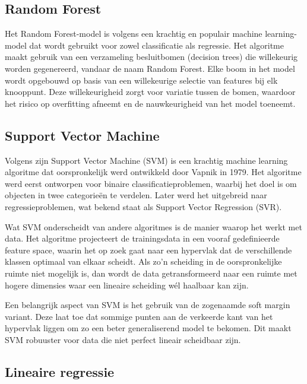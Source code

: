 \subsection*{Random Forest}

Het Random Forest-model is volgens \textcite{Sekhar2016} een krachtig en populair machine learning-model dat wordt gebruikt voor zowel classificatie als regressie. Het algoritme maakt gebruik van een verzameling besluitbomen (decision trees) die willekeurig worden gegenereerd, vandaar de naam Random Forest. Elke boom in het model wordt opgebouwd op basis van een willekeurige selectie van features bij elk knooppunt. Deze willekeurigheid zorgt voor variatie tussen de bomen, waardoor het risico op overfitting afneemt en de nauwkeurigheid van het model toeneemt. 

\newpage

\subsection*{Support Vector Machine}

Volgens \textcite{RodriguezPerez2022} zijn Support Vector Machine (SVM) is een krachtig machine learning algoritme dat oorspronkelijk werd ontwikkeld door Vapnik in 1979. Het algoritme werd eerst ontworpen voor binaire classificatieproblemen, waarbij het doel is om objecten in twee categorieën te verdelen. Later werd het uitgebreid naar regressieproblemen, wat bekend staat als Support Vector Regression (SVR).

\vspace{1em}

Wat SVM onderscheidt van andere algoritmes is de manier waarop het werkt met data. Het algoritme projecteert de trainingsdata in een vooraf gedefinieerde feature space, waarin het op zoek gaat naar een hypervlak dat de verschillende klassen optimaal van elkaar scheidt. Als zo’n scheiding in de oorspronkelijke ruimte niet mogelijk is, dan wordt de data getransformeerd naar een ruimte met hogere dimensies waar een lineaire scheiding wél haalbaar kan zijn.

\vspace{1em}

Een belangrijk aspect van SVM is het gebruik van de zogenaamde soft margin variant. Deze laat toe dat sommige punten aan de verkeerde kant van het hypervlak liggen om zo een beter generaliserend model te bekomen. Dit maakt SVM robuuster voor data die niet perfect lineair scheidbaar zijn.

\subsection*{Lineaire regressie}

